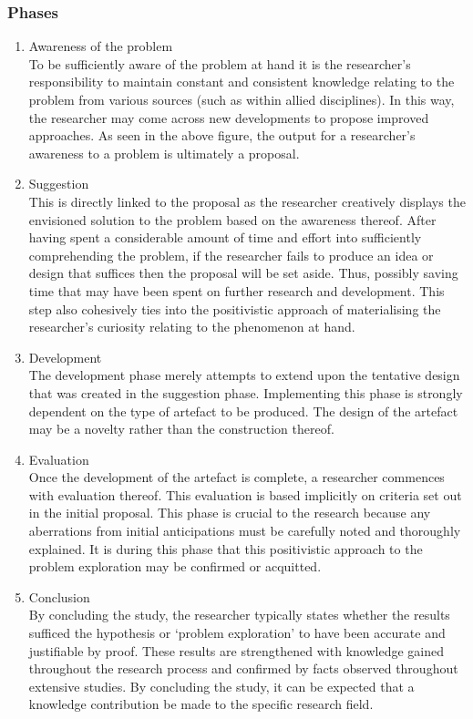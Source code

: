 \subsubsection{Phases}
\begin{enumerate}[label=\roman*.]
	\item Awareness of the problem\\
	To be sufficiently aware of the problem at hand it is the researcher’s responsibility to maintain constant and consistent knowledge relating to the problem from various sources (such as within allied disciplines). In this way, the researcher may come across new developments to propose improved approaches. As seen in the above figure, the output for a researcher’s awareness to a problem is ultimately a proposal.
	
	\item Suggestion \\
	This is directly linked to the proposal as the researcher creatively displays the envisioned solution to the problem based on the awareness thereof. After having spent a considerable amount of time and effort into sufficiently comprehending the problem, if the researcher fails to produce an idea or design that suffices then the proposal will be set aside. Thus, possibly saving time that may have been spent on further research and development.
This step also cohesively ties into the positivistic approach of materialising the researcher’s curiosity relating to the phenomenon at hand.

	\item Development \\
	The development phase merely attempts to extend upon the tentative design that was created in the suggestion phase. Implementing this phase is strongly dependent on the type of artefact to be produced. The design of the artefact may be a novelty rather than the construction thereof.
	
	\item Evaluation \\
	Once the development of the artefact is complete, a researcher commences with evaluation thereof. This evaluation is based implicitly on criteria set out in the initial proposal. This phase is crucial to the research because any aberrations from initial anticipations must be carefully noted and thoroughly explained. It is during this phase that this positivistic approach to the problem exploration may be confirmed or acquitted. 
	
	\item Conclusion \\
	By concluding the study, the researcher typically states whether the results sufficed the hypothesis or ‘problem exploration’ to have been accurate and justifiable by proof. These results are strengthened with knowledge gained throughout the research process and confirmed by facts observed throughout extensive studies. By concluding the study, it can be expected that a knowledge contribution be made to the specific research field.
\end{enumerate}

